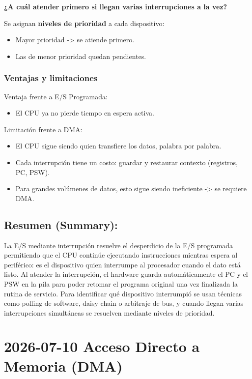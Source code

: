 \documentclass{article}
\begin{document}
\textbf{¿A cuál atender primero si llegan varias interrupciones a la vez?}

Se asignan \textbf{niveles de prioridad} a cada dispositivo:
\begin{itemize}
\item Mayor prioridad -> se atiende primero.
\item Las de menor prioridad quedan pendientes.
\end{itemize}

\subsubsection{Ventajas y limitaciones}
\label{sec:org3845522}
Ventaja frente a E/S Programada:
\begin{itemize}
\item El CPU ya no pierde tiempo en espera activa.
\end{itemize}

Limitación frente a DMA:
\begin{itemize}
\item El CPU sigue siendo quien transfiere los datos, palabra por palabra.
\item Cada interrupción tiene un costo: guardar y restaurar contexto
(registros, PC, PSW).
\item Para grandes volúmenes de datos, esto sigue siendo ineficiente ->
se requiere DMA.
\end{itemize}

\subsection{Resumen (Summary):}
\label{sec:org7774b89}
La E/S mediante interrupción resuelve el desperdicio de la E/S
programada permitiendo que el CPU continúe ejecutando instrucciones
mientras espera al periférico: es el dispositivo quien interrumpe al
procesador cuando el dato está listo. Al atender la interrupción, el
hardware guarda automáticamente el PC y el PSW en la pila para poder
retomar el programa original una vez finalizada la rutina de servicio.
Para identificar qué dispositivo interrumpió se usan técnicas como
polling de software, daisy chain o arbitraje de bus, y cuando llegan
varias interrupciones simultáneas se resuelven mediante niveles de
prioridad.

\section{2026-07-10 Acceso Directo a Memoria (DMA)}
\label{sec:orgd0b9b55}
\end{document}

